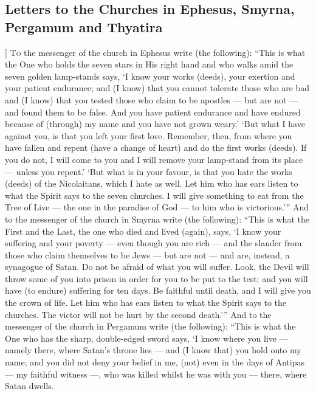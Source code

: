 \begin{pages}
\begin{Leftside}
        			\chapter{Letters to the Churches in Ephesus, Smyrna, Pergamum and Thyatira}
				]
			\renewcommand\LettrineFontHook{\Zallmanfamily}
			\lettrine[lines=3]{T}{o} the messenger of the church in Ephesus write (the following): “This is what the One who holds the seven stars in His right hand and who walks amid the seven golden lamp-stands says, ‘I know your works (deeds), your exertion and your patient endurance; and (I know) that you cannot tolerate those who are bad and (I know) that you tested those who claim to be apostles — but are not — and found them to be false. And you have patient endurance and have endured because of (through) my name and you have not grown weary.’ 
		\pend
		\pstart
			‘But what I have against you, is that you left your first love. Remember, then, from where you have fallen and repent (have a change of heart) and do the first works (deeds). If you do not, I will come to you and I will remove your lamp-stand from its place — unless you repent.’
		\pend
		\pstart
			‘But what is in your favour, is that you hate the works (deeds) of the Nicolaitans, which I hate as well. Let him who has ears listen to what the Spirit says to the seven churches. I will give something to eat from the Tree of Live — the one in the paradise of God — to him who is victorious.’”
		\pend
		\pstart
			And to the messenger of the church in Smyrna write (the following): “This is what the First and the Last, the one who died and lived (again), says, ‘I know your suffering and your poverty — even though you are rich — and the slander from those who claim themselves to be Jews — but are not — and are, instead, a synagogue of Satan. Do not be afraid of what you will suffer. Look, the Devil will throw some of you into prison in order for you to be put to the test; and you will have (to endure) suffering for ten days. Be faithful until death, and I will give you the crown of life. Let him who has ears listen to what the Spirit says to the churches. The victor will not be hurt by the second death.’”
		\pend
		\pstart
			And to the messenger of the church in Pergamum write (the following): “This is what the One who has the sharp, double-edged sword says, ‘I know where you live — namely there, where Satan’s throne lies — and (I know that) you hold onto my name; and you did not deny your belief in me, (not) even in the days of Antipas — my faithful witness —, who was killed whilst he was with you — there, where Satan dwells.

\end{Leftside}
\end{pages}
